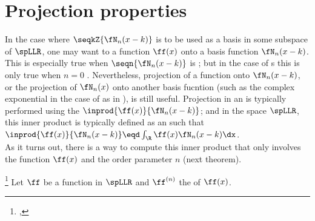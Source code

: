 \section{Projection properties}
In the case where $\seqkZ{\fN_n(x-k)}$ is to be used as a basis in some subspace of $\spLLR$,
one may want to  a function $\ff(x)$ onto a basis function $\fN_n(x-k)$.
This is especially true when $\seqn{\fN_n(x-k)}$ is ;
but in the case of s this is only true when $n=0$ .
Nevertheless, projection of a function onto $\fN_n(x-k)$, or the projection 
of $\fN_n(x)$ onto another basis fucntion 
(such as the complex exponential in the case of  as in ),
is still useful. 
Projection in an  is typically performed using the  
$\inprod{\ff(x)}{\fN_n(x-k)}$; and in the space $\spLLR$,
this inner product is typically defined as an  such that 
  \\\indentx$\inprod{\ff(x)}{\fN_n(x-k)}\eqd\int_\R\ff(x)\fN_n(x-k)\dx$.\\
As it turns out, there is a way to compute this inner product that only involves the function $\ff(x)$ 
and the order parameter $n$ (next theorem).
\begin{theorem}
\footnote{
  ,
  }
\label{thm:int_fNn}
Let $\ff$ be a  function in $\spLLR$
and $\ff^{(n)}$ the  of $\ff(x)$.
\end{theorem}
